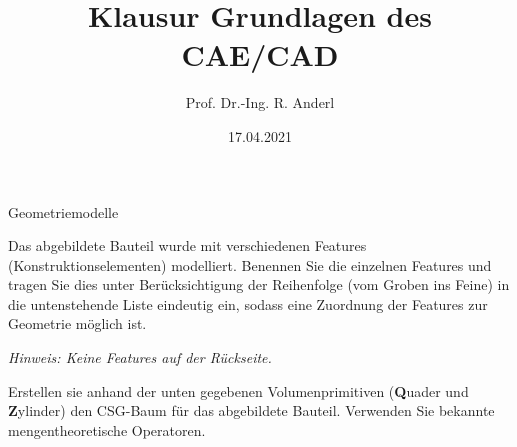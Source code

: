 \documentclass[
	ngerman,
	color = black,
	]{tudaexercise}
\begin{document}
\title[Übung TUDaExercise]{Klausur Grundlagen des CAE/CAD}
\author{Prof. Dr.-Ing. R. Anderl}
\date{17.04.2021}

\maketitle

\begin{task}[credit=13 P]{Geometriemodelle}
	\begin{subtask}[credit=4 P]
		Das abgebildete Bauteil wurde mit verschiedenen Features (Konstruktionselementen) modelliert.
		Benennen Sie die einzelnen Features und tragen Sie dies unter Berücksichtigung der Reihenfolge (vom Groben ins Feine) in die untenstehende Liste eindeutig ein, sodass eine Zuordnung der Features zur Geometrie möglich ist.
		
		\textit{Hinweis: Keine Features auf der Rückseite.} %
		
	\end{subtask}
	
	\begin{subtask}[credit=9 P]
		Erstellen sie anhand der unten gegebenen Volumenprimitiven (\textbf{Q}uader und \textbf{Z}ylinder) den CSG-Baum für das abgebildete Bauteil.
		Verwenden Sie bekannte mengentheoretische Operatoren.
	\end{subtask}

	
\end{task}
\end{document}
